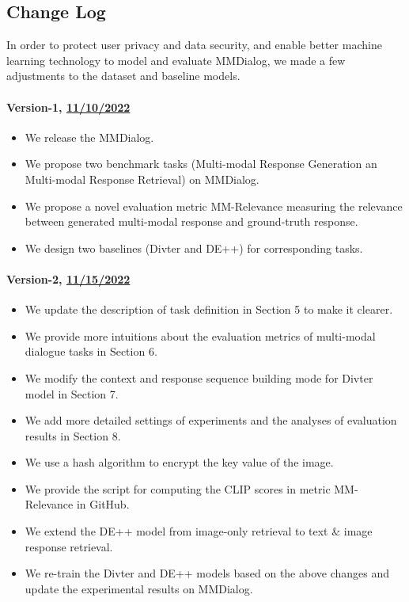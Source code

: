 \documentclass[11pt]{article}
\newcommand{\DataName}{MMDialog}
\begin{document}
\subsection{Change Log}\label{appendix:changelog}
In order to  protect user privacy and data security, and enable better machine learning technology to model and evaluate \DataName, we made a few adjustments to the dataset and baseline models.
\paragraph{Version-1, \href{https://arxiv.org/abs/2211.05719v1}{11/10/2022}}
\par


\begin{itemize}
\setlength{\itemsep}{0pt}
    \item We release the \DataName.
    \item We propose two benchmark tasks (Multi-modal Response Generation an Multi-modal Response Retrieval) on \DataName.
    \item We propose a novel evaluation metric MM-Relevance measuring the relevance between generated multi-modal response and ground-truth response.
    \item We design two baselines (Divter and DE++) for corresponding tasks.
\end{itemize}

\paragraph{Version-2, \href{https://arxiv.org/abs/2211.05719v2}{11/15/2022}}
\par

\begin{itemize}
\setlength{\itemsep}{0pt}
    \item We update the description of task definition in Section 5 to make it clearer.
    \item We provide more intuitions about the evaluation metrics of multi-modal dialogue tasks in Section 6.
    \item We modify the context and response sequence building mode for Divter model in Section 7. 
    \item We add more detailed settings of experiments and the analyses of evaluation results in Section 8.
    \item We use a hash algorithm to encrypt the key value of the image.
    \item We provide the script for computing the CLIP scores in metric MM-Relevance in GitHub.
    \item We extend the DE++ model from image-only retrieval to text \& image response retrieval.
    \item We re-train the Divter and DE++ models based on the above changes and update the experimental results on \DataName.
\end{itemize}
\end{document}
